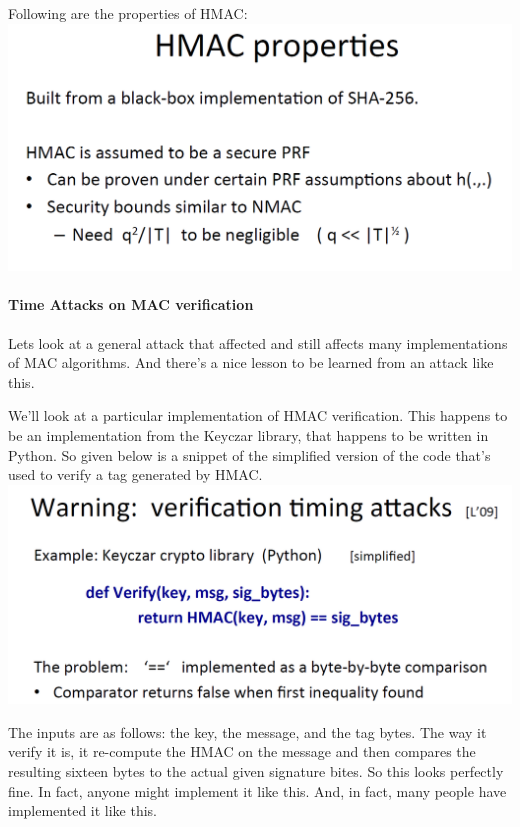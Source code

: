 \documentclass[11pt]{article}
\makeatletter
\def\maxwidth{\ifdim\Gin@nat@width>\linewidth\linewidth
    \else\Gin@nat@width\fi}
\let\Oldincludegraphics\includegraphics
\renewcommand{\includegraphics}[1]{\Oldincludegraphics[width=.8\maxwidth]{#1}}
\makeatother
\begin{document}
Following are the properties of HMAC:
\includegraphics{./Images/HMAC-Properties.png}

\hypertarget{time-attacks-on-mac-verification}{%
\paragraph{Time Attacks on MAC
verification}\label{time-attacks-on-mac-verification}}

Lets look at a general attack that affected and still affects many
implementations of MAC algorithms. And there's a nice lesson to be
learned from an attack like this.

We'll look at a particular implementation of HMAC verification. This
happens to be an implementation from the Keyczar library, that happens
to be written in Python. So given below is a snippet of the simplified
version of the code that's used to verify a tag generated by HMAC.
\includegraphics{./Images/WeaknessInImplementation.png}

The inputs are as follows: the key, the message, and the tag bytes. The
way it verify it is, it re-compute the HMAC on the message and then
compares the resulting sixteen bytes to the actual given signature
bites. So this looks perfectly fine. In fact, anyone might implement it
like this. And, in fact, many people have implemented it like this.
\end{document}
